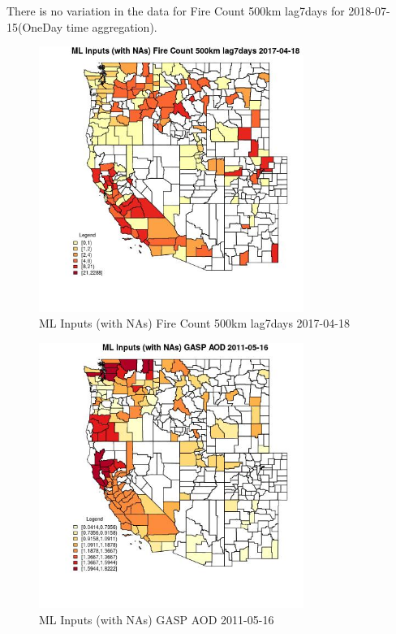 There is no variation in the data for Fire Count 500km lag7days for 2018-07-15(OneDay time aggregation). 
 

\begin{figure} 
\centering  
\includegraphics[width=0.77\textwidth]{Code_Outputs/Report_ML_input_PM25_Step4_part_e_de_duplicated_aves_compiled_2019-05-21wNAs_CountyFire_Count_500km_lag7daysMean2017-04-18.jpg} 
\caption{\label{fig:Report_ML_input_PM25_Step4_part_e_de_duplicated_aves_compiled_2019-05-21wNAsCountyFire_Count_500km_lag7daysMean2017-04-18}ML Inputs (with NAs) Fire Count 500km lag7days 2017-04-18} 
\end{figure} 
 

\begin{figure} 
\centering  
\includegraphics[width=0.77\textwidth]{Code_Outputs/Report_ML_input_PM25_Step4_part_e_de_duplicated_aves_compiled_2019-05-21wNAs_CountyGASP_AODMean2011-05-16.jpg} 
\caption{\label{fig:Report_ML_input_PM25_Step4_part_e_de_duplicated_aves_compiled_2019-05-21wNAsCountyGASP_AODMean2011-05-16}ML Inputs (with NAs) GASP AOD 2011-05-16} 
\end{figure} 
 

